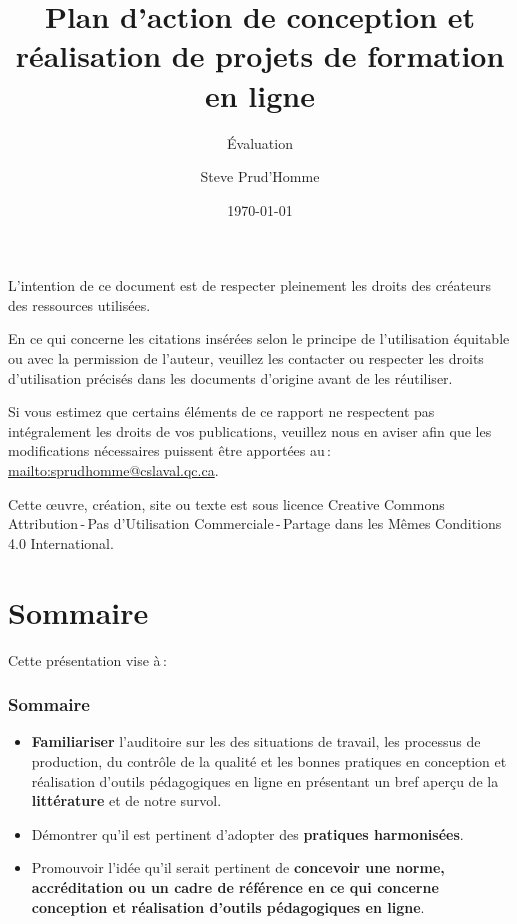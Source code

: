 	\title{Plan d’action de conception et réalisation de projets de formation en ligne} 
	\subtitle{Évaluation}
	\author{Steve Prud'Homme} 
	\date{\today} 

	
	
	\frame{\titlepage} 
    
	\usebackgroundtemplate{ } 
	\par L’intention de ce document est de respecter pleinement les droits des créateurs des ressources
utilisées.
	\par En ce qui concerne les citations insérées selon le principe de l'utilisation équitable ou avec la permission de l'auteur, veuillez les contacter ou respecter les droits d’utilisation précisés dans les documents d’origine avant de les réutiliser.
	\par Si vous estimez que certains éléments de ce rapport ne respectent pas intégralement les droits de vos
publications, veuillez nous en aviser afin que les modifications nécessaires puissent être apportées au\,: \url{mailto:sprudhomme@cslaval.qc.ca}.
	\par Cette \oe uvre, création, site ou texte est sous licence Creative Commons Attribution\,-\,Pas d’Utilisation Commerciale\,-\,Partage dans les Mêmes Conditions 4.0 International.	\section{Sommaire} 
		\begin{frame}
			Cette présentation vise à\,:
			\frametitle{Sommaire}
			\begin {itemize}
				\item \textbf{Familiariser} l'auditoire sur les des situations de travail, les processus de production, 
du contrôle de la qualité et  les  bonnes pratiques en conception et réalisation d’outils pédagogiques en ligne en présentant un bref aperçu de la \textbf{littérature} et de notre survol.
				\item Démontrer qu'il est pertinent d'adopter des \textbf{pratiques harmonisées}.
				\item Promouvoir l'idée qu'il serait pertinent de \textbf{concevoir une norme, accréditation ou un cadre de référence en ce qui concerne conception et réalisation d’outils pédagogiques en ligne}.

			\end{itemize}
		\end{frame}


